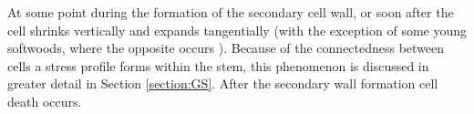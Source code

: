 At some point during the formation of the secondary cell wall, or soon after the
cell shrinks vertically and expands tangentially \citep{Boyd_1972} (with the exception of
some young softwoods, where the opposite occurs \citep{jacobs1945l}). Because of the connectedness
between cells a stress profile forms within the stem, this phenomenon is discussed
in greater detail in Section \ref{section:GS}. After the secondary wall formation cell death
occurs.